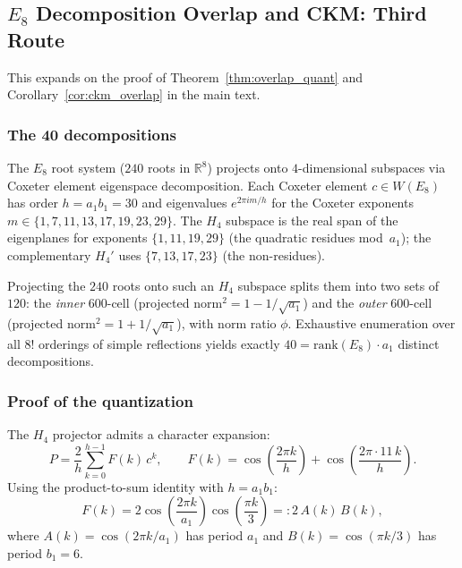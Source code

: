 \documentclass[12pt,a4paper]{article}
\theoremstyle{definition}
\begin{document}
\subsection{$E_8$ Decomposition Overlap and CKM: Third Route}
\label{sec:S-e8-overlap-ckm}

This expands on the proof of Theorem~\ref{thm:overlap_quant} and Corollary~\ref{cor:ckm_overlap} in the main text.

\subsubsection{The 40 decompositions}
The $E_8$ root system ($240$ roots in $\mathbb{R}^8$) projects onto $4$-dimensional subspaces via Coxeter element eigenspace decomposition.  Each Coxeter element $c \in W(E_8)$ has order $h = a_1 b_1 = 30$ and eigenvalues $e^{2\pi i m/h}$ for the Coxeter exponents $m \in \{1, 7, 11, 13, 17, 19, 23, 29\}$.  The $H_4$ subspace is the real span of the eigenplanes for exponents $\{1, 11, 19, 29\}$ (the quadratic residues mod~$a_1$); the complementary $H_4'$ uses $\{7, 13, 17, 23\}$ (the non-residues).

Projecting the $240$ roots onto such an $H_4$ subspace splits them into two sets of $120$: the \emph{inner} 600-cell (projected norm${}^2 = 1 - 1/\sqrt{a_1}$) and the \emph{outer} 600-cell (projected norm${}^2 = 1 + 1/\sqrt{a_1}$), with norm ratio $\phi$.  Exhaustive enumeration over all $8!$ orderings of simple reflections yields exactly $40 = \mathrm{rank}(E_8) \cdot a_1$ distinct decompositions.

\subsubsection{Proof of the quantization}
\label{sec:S-overlap-proof}

The $H_4$ projector admits a character expansion:
\begin{equation}
P = \frac{2}{h}\sum_{k=0}^{h-1} F(k)\, c^k, \qquad F(k) = \cos\!\left(\frac{2\pi k}{h}\right) + \cos\!\left(\frac{2\pi \cdot 11\, k}{h}\right).
\end{equation}
Using the product-to-sum identity with $h = a_1 b_1$:
\begin{equation}
F(k) = 2\cos\!\left(\frac{2\pi k}{a_1}\right)\cos\!\left(\frac{\pi k}{3}\right) =: 2\, A(k)\, B(k),
\end{equation}
where $A(k) = \cos(2\pi k/a_1)$ has period $a_1$ and $B(k) = \cos(\pi k/3)$ has period $b_1 = 6$.
\end{document}
